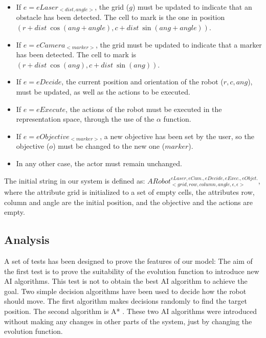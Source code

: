 \documentclass{svmult}
\begin{document}
\begin{itemize}
	\item If $e=eLaser_{<dist,angle>}$, the grid ($g$) must be updated 
			to indicate that an obstacle has been detected. The cell to
			mark is the one in position $(r+dist\ \cos(ang+angle), c+dist \ \sin(ang+angle))$.
			
	\item If $e = eCamera_{<marker>}$, the grid must be updated to indicate 
			that a marker has been detected. The cell to mark is 
			$(r+dist \ \cos(ang), c+dist \ \sin(ang))$.
			
	\item If $e = eDecide$, the current position and orientation of the robot ($r, c, ang$), 
			must be updated, as well as the actions to be executed. 
			
	\item If $e = eExecute$, the actions of the robot must be executed in the representation space, 
			through the use of the $\alpha$ function.
			
	\item If $e = eObjective_{<marker>}$, a new objective has been set by the user, 
			so the objective ($o$) must be changed to the new one ($marker$).
			
	\item In any other case, the actor must remain unchanged.
			
\end{itemize}



The initial string in our system is defined as: 
$ARobot^{eLaser, eCam., eDecide, eExec., eObjct.}_{<grid, row, column, angle, \epsilon, \epsilon>}$, 
where the attribute grid is initialized to a set of empty cells, 
the attributes row, column and angle are the initial position, 
and the objective and the actions are empty.



\subsection{Analysis}

A set of tests has been designed to prove the features of our model:
The aim of the first test is to prove the suitability of the evolution function to introduce new AI algorithms. 
This test is not to obtain the best AI algorithm to achieve the goal. 
Two simple decision algorithms have been used to decide how the robot should move. The first algorithm makes decisions randomly to find the target position. The second algorithm is A* \cite{Luo2010}.
These two AI algorithms were introduced without making any changes in other parts of the system, 
just by changing the evolution function. 
\end{document}
